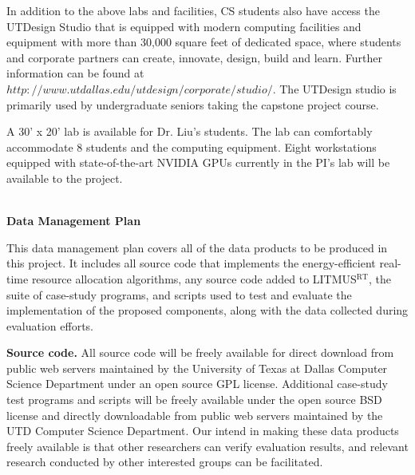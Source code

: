 \documentclass[10pt,letterpaper]{article}
\begin{document}
In addition to the above labs and facilities, CS students also have access the UTDesign Studio that is equipped with modern computing facilities and equipment with more than 30,000 square feet of dedicated space, where students and corporate partners can create, innovate, design, build and learn. Further information can be found at $http://www.utdallas.edu/utdesign/corporate/studio/$. The UTDesign studio is primarily used by undergraduate seniors taking the capstone project course.

A 30' x 20' lab is available for Dr. Liu's students. The lab can comfortably accommodate 8 students and the computing equipment. Eight workstations equipped with state-of-the-art NVIDIA GPUs currently in the PI's lab will be available to the project.


\newpage
{}

\begin{center}
\Large{\textbf{\\Data Management Plan}}
\end{center}

This data management plan covers all of the data products to be produced in this project. It includes all source code that implements the energy-efficient real-time resource allocation algorithms, any source code added to LITMUS$^{\textrm{RT}}$,  the suite of case-study programs, and scripts used to test and evaluate the implementation of the proposed components, along with the data collected during evaluation efforts. 

\vspace{1mm}
\noindent \textbf{Source code.} All source code will be freely available for direct download from public web servers maintained by the University of Texas at Dallas Computer Science Department under an open source GPL license.  Additional case-study test programs and scripts will be freely available under the open source BSD license and directly downloadable from public web servers maintained by the UTD Computer Science Department. Our intend in making these data products freely available is that other researchers can verify evaluation results, and relevant research conducted by other interested groups can be facilitated.
\end{document}
